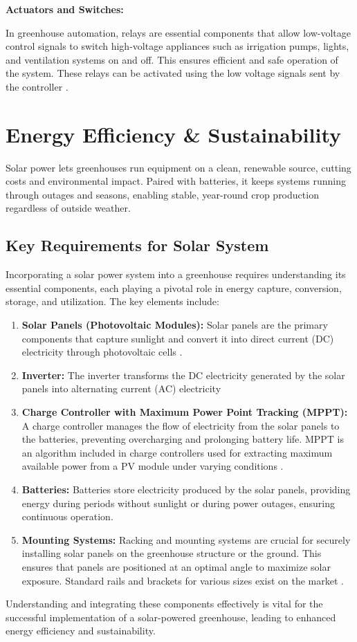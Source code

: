 \textbf{Actuators and Switches:}

In greenhouse automation, relays are essential components that allow low-voltage control signals to switch high-voltage appliances such as irrigation pumps, lights, and ventilation systems on and off. This ensures efficient and safe operation of the system. These relays can be activated using the low voltage signals sent by the controller \citep{farooq2022}.

\section{Energy Efficiency \& Sustainability}

Solar power lets greenhouses run equipment on a clean, renewable source, cutting costs and environmental impact. Paired with batteries, it keeps systems running through outages and seasons, enabling stable, year-round crop production regardless of outside weather.

\subsection{Key Requirements for Solar System}

Incorporating a solar power system into a greenhouse requires understanding its essential components, each playing a pivotal role in energy capture, conversion, storage, and utilization. The key elements include:

\begin{enumerate}
    \item \textbf{Solar Panels (Photovoltaic Modules):} Solar panels are the primary components that capture sunlight and convert it into direct current (DC) electricity through photovoltaic cells \citep{Krisciunas2023}.
    
    \item \textbf{Inverter:} The inverter transforms the DC electricity generated by the solar panels into alternating current (AC) electricity
    
    \item \textbf{Charge Controller with Maximum Power Point Tracking (MPPT):} A charge controller manages the flow of electricity from the solar panels to the batteries, preventing overcharging and prolonging battery life. MPPT is an algorithm included in charge controllers used for extracting maximum available power from a PV module under varying conditions \citep{Eltawil2013}.
    
    \item \textbf{Batteries:} Batteries store electricity produced by the solar panels, providing energy during periods without sunlight or during power outages, ensuring continuous operation.
    
    \item \textbf{Mounting Systems:} Racking and mounting systems are crucial for securely installing solar panels on the greenhouse structure or the ground. This ensures that panels are positioned at an optimal angle to maximize solar exposure. Standard rails and brackets for various sizes exist on the market \citep{axe_struct_solar_mounting}.
\end{enumerate}

Understanding and integrating these components effectively is vital for the successful implementation of a solar-powered greenhouse, leading to enhanced energy efficiency and sustainability.
